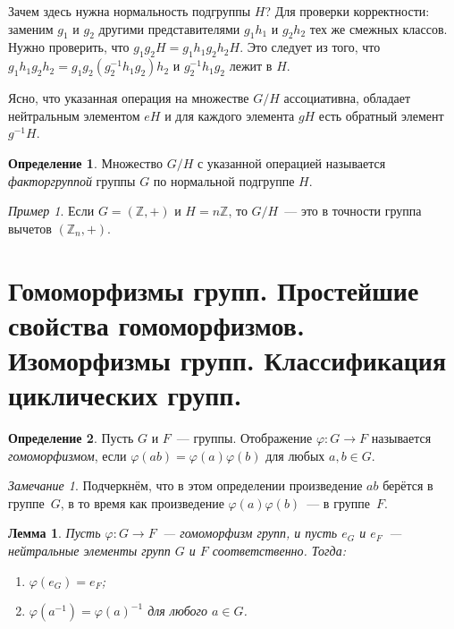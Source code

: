 \documentclass[a4paper, 12pt]{article}
\def\ZZ{{\mathbb Z}}%
\newtheorem{lemma}{Лемма}
\theoremstyle{definition}
\newtheorem{definition}{Определение}
\theoremstyle{remark}
\newtheorem{remark}{Замечание}
\newtheorem{example}{Пример}
\begin{document}
Зачем здесь нужна нормальность подгруппы $H$? Для проверки
корректности: заменим $g_1$ и $g_2$ другими представителями $g_1h_1$
и $g_2h_2$ тех же смежных классов. Нужно проверить, что
$g_1g_2H=g_1h_1g_2h_2H$. Это следует из того, что
$g_1h_1g_2h_2=g_1g_2(g_2^{-1}h_1g_2)h_2$ и $g_2^{-1}h_1g_2$ лежит в
$H$.

Ясно, что указанная операция на множестве $G/H$ ассоциативна,
обладает нейтральным элементом $eH$ и для каждого элемента $gH$ есть
обратный элемент $g^{-1}H$.

\begin{definition}
Множество $G/H$ с указанной операцией называется {\it факторгруппой}
группы $G$ по нормальной подгруппе $H$.
\end{definition}

\begin{example}
Если $G=(\ZZ,+)$ и $H=n\ZZ$, то $G/H$~--- это в точности группа
вычетов $(\ZZ_n,+)$.
\end{example}



\section{Гомоморфизмы групп. Простейшие свойства гомоморфизмов. Изоморфизмы групп. Классификация циклических групп.}

\begin{definition}
Пусть $G$ и $F$~--- группы. Отображение $\varphi\colon G\to F$
называется {\it гомоморфизмом}, если
$\varphi(ab)=\varphi(a)\varphi(b)$ для любых $a,b\in G$.
\end{definition}

\begin{remark}
Подчеркнём, что в этом определении произведение $ab$ берётся в
группе~$G$, в то время как произведение $\varphi(a) \varphi(b)$~---
в группе~$F$.
\end{remark}

\begin{lemma}
Пусть $\varphi \colon G \to F$~--- гомоморфизм групп, и пусть $e_G$
и $e_F$~--- нейтральные элементы групп $G$ и $F$ соответственно.
Тогда:

\vspace{-2mm}
\begin{enumerate}
\item[(а)]
$\varphi(e_G) = e_F$;

\item[(б)]
$\varphi(a^{-1})=\varphi(a)^{-1}$ для любого $a\in G$.
\end{enumerate}
\end{lemma}
\end{document}
